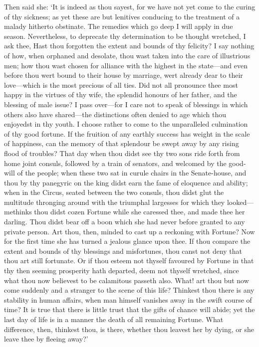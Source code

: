 \documentclass[12pt]{book}
\begin{document}
Then said she: `It is indeed as thou sayest, for we have not yet come to
the curing of thy sickness; as yet these are but lenitives conducing to
the treatment of a malady hitherto obstinate. The remedies which go deep
I will apply in due season. Nevertheless, to deprecate thy
determination to be thought wretched, I ask thee, Hast thou forgotten
the extent and bounds of thy felicity? I say nothing of how, when
orphaned and desolate, thou wast taken into the care of illustrious men;
how thou wast chosen for alliance with the highest in the state---and
even before thou wert bound to their house by marriage, wert already
dear to their love---which is the most precious of all ties. Did not all
pronounce thee most happy in the virtues of thy wife, the splendid
honours of her father, and the blessing of male issue? I pass over---for
I care not to speak of blessings in which others also have shared---the
distinctions often denied to age which thou enjoyedst in thy youth. I
choose rather to come to the unparalleled culmination of thy good
fortune. If the fruition of any earthly success has weight in the scale
of happiness, can the memory of that splendour be swept away by any
rising flood of troubles? That day when thou didst see thy two sons ride
forth from home joint consuls, followed by a train of senators, and
welcomed by the good-will of the people; when these two sat in curule
chairs in the Senate-house, and thou by thy panegyric on the king didst
earn the fame of eloquence and ability; when in the Circus, seated
between the two consuls, thou didst glut the multitude thronging around
with the triumphal largesses for which they looked---methinks thou didst
cozen Fortune while she caressed thee, and made thee her darling. Thou
didst bear off a boon which she had never before granted to any private
person. Art thou, then, minded to cast up a reckoning with Fortune? Now
for the first time she has turned a jealous glance upon thee. If thou
compare the extent and bounds of thy blessings and misfortunes, thou
canst not deny that thou art still fortunate. Or if thou esteem not
thyself favoured by Fortune in that thy then seeming prosperity hath
departed, deem not thyself wretched, since what thou now believest to be
calamitous passeth also. What! art thou but now come suddenly and a
stranger to the scene of this life? Thinkest thou there is any stability
in human affairs, when man himself vanishes away in the swift course of
time? It is true that there is little trust that the gifts of chance
will abide; yet the last day of life is in a manner the death of all
remaining Fortune. What difference, then, thinkest thou, is there,
whether thou leavest her by dying, or she leave thee by fleeing away?'
\end{document}
